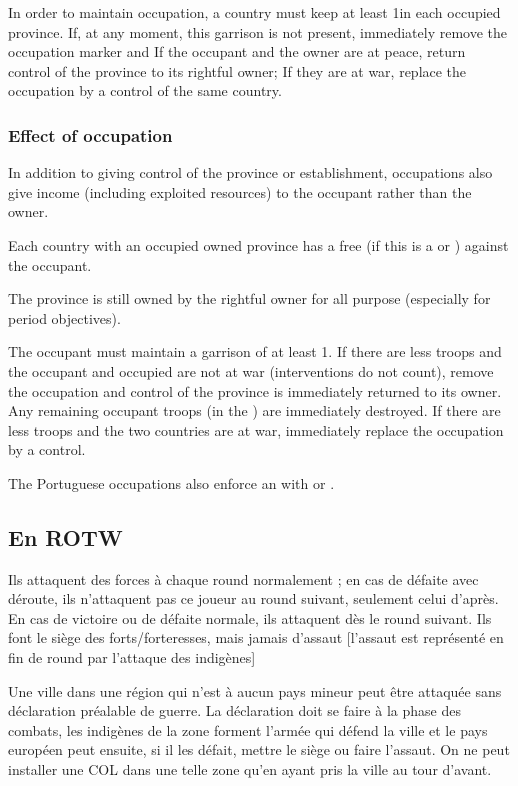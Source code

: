 \aparag In order to maintain occupation, a country must keep at least
1\LD in each occupied province. If, at any moment, this garrison is
not present, immediately remove the occupation marker and
\bparag If the occupant and the owner are at peace, return
control of the province to its rightful owner;
\bparag If they are at war, replace the occupation by a control of the
same country.

\subsubsection{Effect of occupation}
\aparag In addition to giving control of the province or
establishment, occupations also give income (including exploited
resources) to the occupant rather than the owner.

\aparag Each country with an occupied owned province has a free \CB
(\OCB if this is a \COL or \TP) against the occupant.

\aparag The province is still owned by the rightful owner for all \VPs
purpose (especially for period objectives).

\aparag The occupant must maintain a garrison of at least 1\LD.
\bparag If there are less troops and the occupant and occupied are not
at war (interventions do not count), remove the occupation and control
of the province is immediately returned to its owner. Any remaining
occupant troops (\de in the \ROTW) are immediately destroyed.
\bparag If there are less troops and the two countries are at war,
immediately replace the occupation by a control.

\aparag The Portuguese occupations also enforce an \dipAT with
\paysOman or \paysAden.

\subsection{En ROTW}

Ils attaquent des forces à chaque round normalement ; en cas
de défaite avec déroute, ils n'attaquent pas ce joueur au
round suivant, seulement celui d'après. En cas de victoire
ou de défaite normale, ils attaquent dès le round suivant.
Ils font le siège des forts/forteresses, mais jamais d'assaut
[l'assaut est représenté en fin de round par l'attaque des indigènes]

\aparag Une ville dans une région qui n'est à aucun pays mineur peut
être attaquée sans déclaration préalable de guerre. La déclaration
doit se faire à la phase des combats, les indigènes de la zone
forment l'armée qui défend la ville et le pays européen peut
ensuite, si il les défait, mettre le siège ou faire l'assaut.
On ne peut installer une COL dans une telle zone qu'en ayant
pris la ville au tour d'avant.

